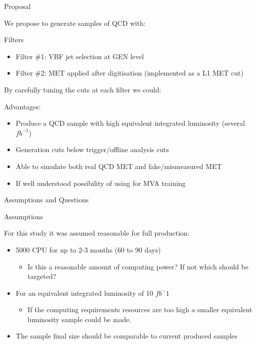 \documentclass[8pt]{beamer}
\begin{document}
\begin{frame}{Proposal}

We propose to generate samples of QCD with:
\begin{block}{Filters}

\begin{itemize}
  \item Filter \#1: VBF jet selection at GEN level
  \item Filter \#2: MET applied after digitisation (implemented as a L1 MET cut)
\end{itemize}
  
\end{block}

By carefully tuning the cuts at each filter we could:
\begin{block}{Advantages:}

\begin{itemize}
  \item Produce a QCD sample with high equivalent integrated luminosity (several $fb^{-1}$)
  \item Generation cuts below trigger/offline analysis cuts 
  \item Able to simulate both real QCD MET and fake/mismeasured MET
  \item If well understood possibility of using for MVA training
\end{itemize}

\end{block}

\end{frame}

\begin{frame}{Assumptions and Questions}
  
\begin{block}{Assumptions}

For this study it was assumed reasonable for full production: 

\begin{itemize}
  \item 5000 CPU for up to 2-3 months (60 to 90 days)
  \begin{itemize}
    \item Is this a reasonable amount of computing power? If not which should be targeted? 
  \end{itemize}
  \item For an equivalent integrated luminosity of 10 $fb^-1$
  \begin{itemize}
    \item If the computing requirements resources are too high a smaller equivalent luminosity sample could be made. 
  \end{itemize}
  \item The sample final size should be comparable to current produced samples
\end{itemize}

\end{block}
  
\end{frame}
\end{document}
